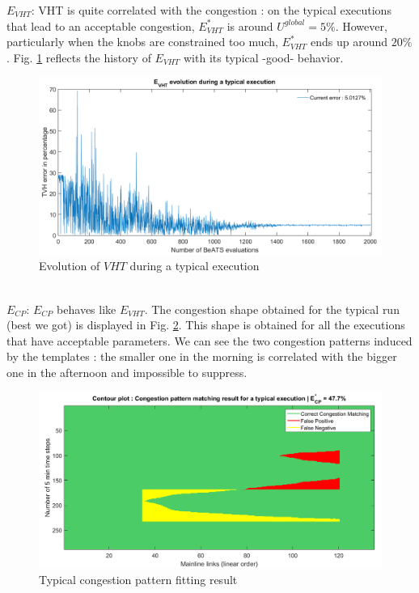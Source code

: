 \newpage
\emph{$E_{VHT}$}: VHT is quite correlated with the congestion : on the typical executions that lead to an acceptable congestion, $E_{VHT}^{*}$ is around $U^{global}=5\%$. However, particularly when the knobs are constrained too much,  $E_{VHT}^{*}$ ends up around $20\%$.
Fig. \ref{fig:vhtexample} reflects the history of $E_{VHT}$ with its typical -good- behavior.
\begin{figure}[!h]
	\caption{Evolution of $VHT$ during a typical execution}
	\label{fig:vhtexample}
	\includegraphics[width=7in]{figures/results_figures/VHTexample.png}
\end{figure}\\
\emph{$E_{CP}$}: $E_{CP}$ behaves like $E_{VHT}$. The congestion shape obtained for the typical run (best we got) is displayed in Fig. \ref{fig:typicalcpexample}. This shape is obtained for all the executions that have acceptable parameters. We can see the two congestion patterns induced by the templates : the smaller one in the morning is correlated with the bigger one in the afternoon and impossible to suppress.
\begin{figure}[!h]
	\caption{Typical congestion pattern fitting result}
	\label{fig:typicalcpexample}
	\includegraphics[width=7in]{figures/results_figures/typicalcpexample.png}
\end{figure}	
